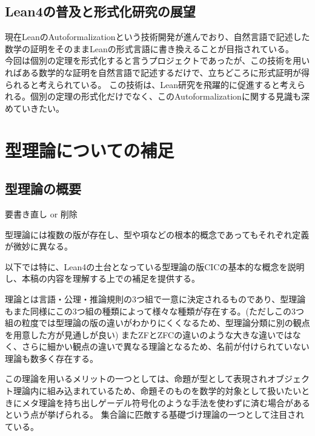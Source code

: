 \documentclass[a4paper,12pt]{bxjsbook}
\newlength{\customindent}
\newenvironment{body}{
  \par
  \begingroup
  \setlength{\leftskip}{\customindent}
  \setlength{\rightskip}{0pt}
  \setlength{\parindent}{1em}
  \setlength{\displayindent}{\customindent}
  \setlength{\displaywidth}{\dimexpr\linewidth-\customindent\relax}
}{
  \par
  \endgroup
}
\theoremstyle{theorem}
\begin{document}
    \section{Lean4の普及と形式化研究の展望}
    \begin{body}
        \indent 現在LeanのAutoformalizationという技術開発が進んでおり、自然言語で記述した数学の証明をそのままLeanの形式言語に書き換えることが目指されている。\\
        今回は個別の定理を形式化すると言うプロジェクトであったが、この技術を用いればある数学的な証明を自然言語で記述するだけで、立ちどころに形式証明が得られると考えられている。
        この技術は、Lean研究を飛躍的に促進すると考えられる。個別の定理の形式化だけでなく、このAutoformalizationに関する見識も深めていきたい。
    \end{body}

    \appendix

    \chapter{型理論についての補足}

    \section{型理論の概要}

    要書き直し or 削除

    \begin{body}
        \indent 型理論には複数の版が存在し、型や項などの根本的概念であってもそれぞれ定義が微妙に異なる。

        \indent 以下では特に、Lean4の土台となっている型理論の版CICの基本的な概念を説明し、本稿の内容を理解する上での補足を提供する。

        \indent 理論とは言語・公理・推論規則の3つ組で一意に決定されるものであり、型理論もまた同様にこの3つ組の種類によって様々な種類が存在する。(ただしこの3つ組の粒度では型理論の版の違いがわかりにくくなるため、型理論分類に別の観点を用意した方が見通しが良い)
        またZFとZFCの違いのような大きな違いではなく、さらに細かい観点の違いで異なる理論となるため、名前が付けられていない理論も数多く存在する。

        \indent この理論を用いるメリットの一つとしては、命題が型として表現されオブジェクト理論内に組み込まれているため、命題そのものを数学的対象として扱いたいときにメタ理論を持ち出しゲーデル符号化のような手法を使わずに済む場合があるという点が挙げられる。
        集合論に匹敵する基礎づけ理論の一つとして注目されている。

    \end{body}
\end{document}
